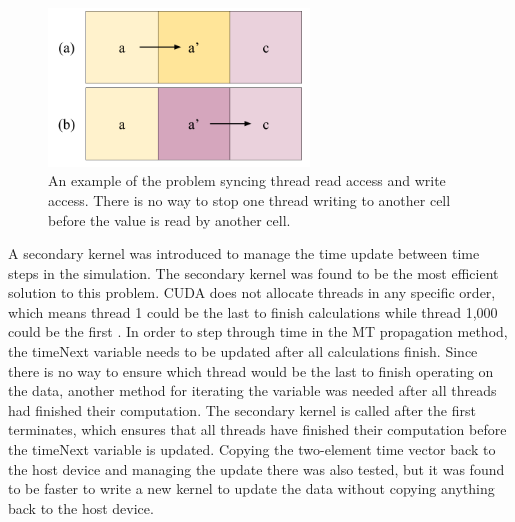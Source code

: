 \begin{figure}%
\centering
  \includegraphics[height=4.2cm]{figures/implementation/read-write-issue.png}
  \caption{An example of the problem syncing thread read access and write access. There is no way to stop one thread writing to another cell before the value is read by another cell.}
  \label{fig:readwrite}
\end{figure}

A secondary kernel was introduced to manage the time update between time steps in the simulation. The secondary kernel was found to be the most efficient solution to this problem. CUDA does not allocate threads in any specific order, which means thread 1 could be the last to finish calculations while thread 1,000 could be the first \cite{cudabyexample}. In order to step through time in the MT propagation method, the timeNext variable needs to be updated after all calculations finish. Since there is no way to ensure which thread would be the last to finish operating on the data, another method for iterating the variable was needed after all threads had finished their computation. The secondary kernel is called after the first terminates, which ensures that all threads have finished their computation before the timeNext variable is updated. Copying the two-element time vector back to the host device and managing the update there was also tested, but it was found to be faster to write a new kernel to update the data without copying anything back to the host device.

